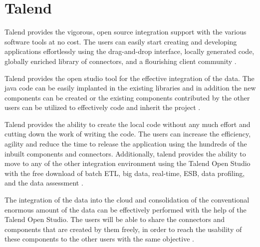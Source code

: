 \section{Talend}
Talend provides the vigorous, open source integration support with the various
software tools at no cost. The users can easily start creating and developing
applications effortlessly using the drag-and-drop interface, locally generated
code, globally enriched library of connectors, and a flourishing client
community \cite{hid-sp18-412-talend_products}.

Talend provides the open studio tool for the effective integration of the data.
 The java code can be easily implanted in the existing libraries and in
addition the new components can be created or the existing components
contributed by the other users can be utilized to effectively code and
inherit the project \cite{hid-sp18-412-talend_open_studio}.

Talend provides the ability to create the local code without any much effort
and cutting down the work of writing the code.
The users can increase the efficiency, agility and
reduce the time to release the application using the hundreds of the
inbuilt components and connectors. Additionally, talend provides the
ability to move to any of the other integration environment using the
Talend Open Studio with the free download of batch ETL, big data, real-time,
ESB, data profiling, and
the data assessment \cite{hid-sp18-412-talend_products}.

The integration of the data into the cloud and consolidation of the
conventional enormous amount of the data can be effectively performed
with the help of the Talend Open Studio. The users will be able to share
the connectors and components that are created by them freely,
in order to reach the usability of these components to the
other users with the same objective \cite{hid-sp18-412-talend_products}.


